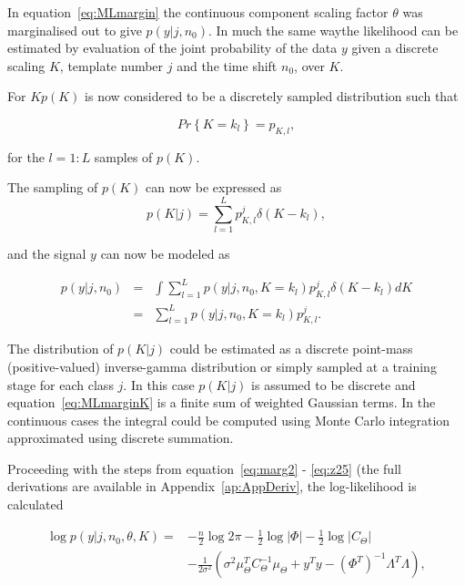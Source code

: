 In equation~\ref{eq:MLmargin} the continuous component scaling factor $\theta$ was marginalised out to give $p(y|j,n_0)$. In much the same way\DIFaddbegin \DIFadd{, }\DIFaddend the likelihood can be estimated by evaluation of the joint probability of the data $y$ given a discrete scaling $K$, template number $j$ and the time shift $n_0$, over $K$.

For $K$\DIFaddbegin \DIFadd{, }\DIFaddend $p(K)$ is now considered to be a discretely sampled distribution such that

\begin{equation}\label{eq:pkldefine}
Pr\left\{K = k_l\right\} = p_{K,l},
\end{equation}

for the $l = 1:L$ samples of $p(K)$.

The sampling of $p(K)$ can now be expressed as
\begin{equation}\label{eq:sampledK}
p(K|j) = \sum_{l=1}^L p^j_{K,l} \delta \left(K - k_l\right),
\end{equation}

and the signal $y$ can now be modeled as

\begin{eqnarray}\label{eq:MLmarginK}
p(y|j,n_0) &=& \int \sum_{l=1}^L p(y|j, n_0, K=k_l) p^j_{K,l} \delta \left(K - k_l\right) dK\\
&=& \sum_{l=1}^L p(y|j, n_0, K=k_l) p^j_{K,l}.
\end{eqnarray}

The distribution of $p(K|j)$ could be estimated as a discrete point-mass \linebreak[0](positive-valued) inverse-gamma distribution or simply sampled at a training stage for each class $j$. In this case $p(K|j)$ is assumed to be discrete and equation~\ref{eq:MLmarginK} is a finite sum of weighted Gaussian terms. In the continuous cases the integral could be computed using Monte Carlo integration approximated using discrete summation.

Proceeding with the steps from equation~\ref{eq:marg2} - \ref{eq:z25} (the full derivations are available in Appendix~\ref{ap:AppDeriv}, the log-likelihood is calculated

\begin{equation}\label{eq:loglikeliK}\begin{split}
\log{p(y|j,n_0,\theta,K)} = &- \frac{n}{2}\log{2 \pi}- \frac{1}{2}\log{|\Phi|} - \frac{1}{2}\log{|C_\Theta|} \\
& -\frac{1}{2\sigma^2}\left(\sigma^2\mu_\Theta^TC_\Theta^{-1}\mu_\Theta + y^Ty- \left(\Phi^T\right)^{-1}\Lambda^T\Lambda\right),
\end{split}\end{equation}

